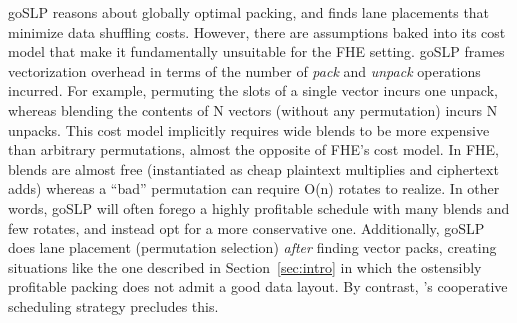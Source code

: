 goSLP \cite{goSLP} reasons about globally optimal packing, and finds lane placements that minimize data shuffling costs. 
However, there are assumptions baked into its cost model that make it fundamentally unsuitable for the FHE setting.
goSLP frames vectorization overhead in terms of the number of {\em pack} and {\em unpack} operations incurred.
For example, permuting the slots of a single vector incurs one unpack, whereas blending the contents of N vectors (without any permutation) incurs N unpacks.
This cost model implicitly requires wide blends to be more expensive than arbitrary permutations, almost the opposite of FHE's cost model. In FHE, blends are almost free (instantiated as cheap plaintext multiplies and ciphertext adds) whereas a ``bad'' permutation can require O(n) rotates to realize.
In other words, goSLP will often forego a highly profitable schedule with many blends and few rotates, and instead opt for a more conservative one.    
Additionally, goSLP does lane placement (permutation selection) {\em after} finding vector packs, creating situations like the one described in Section~\ref{sec:intro} in which the ostensibly profitable packing does not admit a good data layout.
By contrast, \system's cooperative scheduling strategy precludes this.%


